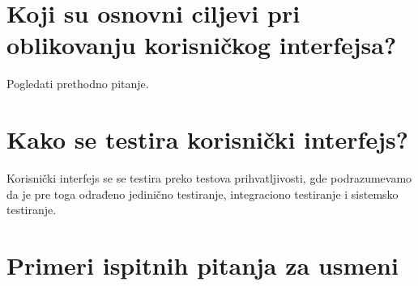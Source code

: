 \documentclass[a4paper]{article}
\begin{document}
\section{Koji su osnovni ciljevi pri oblikovanju korisničkog interfejsa?}
  Pogledati prethodno pitanje.

\section{Kako se testira korisnički interfejs?}
  Korisnički interfejs se se testira preko testova prihvatljivosti, gde podrazumevamo da je pre
  toga odrađeno jedinično testiranje, integraciono testiranje i sistemsko testiranje.
  
\section{Primeri ispitnih pitanja za usmeni}
\end{document}
